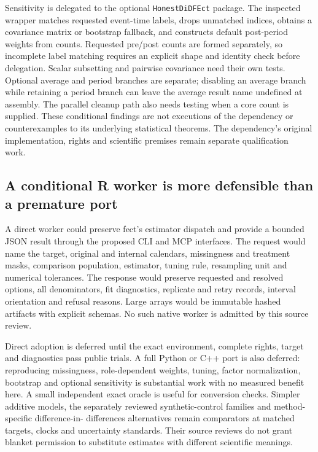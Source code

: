 Sensitivity is delegated to the optional \texttt{HonestDiDFEct} package.
The inspected wrapper matches requested event-time labels, drops unmatched
indices, obtains a covariance matrix or bootstrap fallback, and constructs
default post-period weights from counts. Requested pre/post counts are
formed separately, so incomplete label matching requires an explicit
shape and identity check before delegation. Scalar subsetting and
pairwise covariance need their own tests. Optional average and period
branches are separate; disabling an average branch while retaining a
period branch can leave the average result name undefined at assembly.
The parallel cleanup path also needs testing when a core count is supplied.
These conditional findings are not executions of the dependency or
counterexamples to its underlying statistical theorems. The dependency's
original implementation, rights and scientific premises remain separate
qualification work.~\citep{exec24_fect_source,exec24_fect_choice}

\subsection{A conditional R worker is more defensible than a premature port}
A direct worker could preserve fect's estimator dispatch and provide a
bounded JSON result through the proposed CLI and MCP interfaces. The
request would name the target, original and internal calendars, missingness
and treatment masks, comparison population, estimator, tuning rule,
resampling unit and numerical tolerances. The response would preserve
requested and resolved options, all denominators, fit diagnostics,
replicate and retry records, interval orientation and refusal reasons.
Large arrays would be immutable hashed artifacts with explicit schemas.
No such native worker is admitted by this source review.
\citep{exec24_fect_choice}

Direct adoption is deferred until the exact environment, complete rights,
target and diagnostics pass public trials. A full Python or C++ port is
also deferred: reproducing missingness, role-dependent weights, tuning,
factor normalization, bootstrap and optional sensitivity is substantial
work with no measured benefit here. A small independent exact oracle is
useful for conversion checks. Simpler additive models, the separately
reviewed synthetic-control families and method-specific difference-in-
differences alternatives remain comparators at matched targets, clocks
and uncertainty standards. Their source reviews do not grant blanket
permission to substitute estimates with different scientific meanings.
\citep{exec24_fect_choice}

